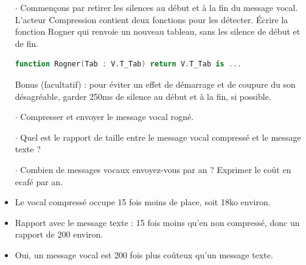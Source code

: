 \begin{reponse}

\end{reponse}
\fi

\begin{itemize}
\item[$\cdot$] Commençons par retirer les silences au début et à la fin du message vocal.
L'acteur Compression contient deux fonctions pour les détecter.
%
Écrire la fonction Rogner qui renvoie un nouveau tableau, sans les silence de début et de fin.
  \begin{lstlisting}[language=Ada]
   function Rogner(Tab : V.T_Tab) return V.T_Tab is ...
   \end{lstlisting}
%
Bonus (facultatif) : pour éviter un effet de démarrage et de coupure du son désagréable, garder 250ms de silence au début et à la fin, si possible.

\item[$\cdot$] Compresser et envoyer le message vocal rogné.
\end{itemize}



\begin{itemize}
\item[$\cdot$] Quel est le rapport de taille entre le message vocal compressé et le message texte ?
\item[$\cdot$] Combien de messages vocaux envoyez-vous par an ? Exprimer le coût en ecafé par an.
\end{itemize}

\begin{reponse}
\begin{itemize}
\item Le vocal compressé occupe 15 fois moins de place, soit 18ko environ.
\item Rapport avec le message texte : 15 fois moins qu'en non compressé, donc un rapport de 200 environ.
\item Oui, un message vocal est 200 fois plus coûteux qu'un message texte.
\end{itemize}
\end{reponse}






